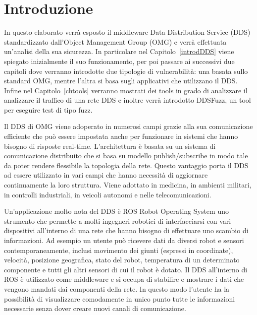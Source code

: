 \chapter{Introduzione}
In questo elaborato verrà esposto il middleware Data Distribution 
Service (DDS) standardizzato dall'Object Management Group (OMG) e 
verrà effettuata un'analisi della sua sicurezza.
In particolare nel Capitolo~\ref{introdDDS} 
viene spiegato inizialmente 
il suo funzionamento, per poi passare ai successivi due capitoli 
dove verranno introdotte due tipologie di vulnerabilità: una 
basata sullo standard OMG, mentre l'altra si basa sugli applicativi
che utilizzano il DDS. Infine nel Capitolo~\ref{chtools} 
verranno 
mostrati dei tools in grado di analizzare il analizzare 
il traffico di una rete DDS e inoltre verrà introdotto DDSFuzz, 
un tool per eseguire test di tipo fuzz.

Il DDS di OMG viene adoperato in numerosi campi grazie alla 
sua comunicazione efficiente che può essere impostata anche 
per funzionare in sistemi che hanno bisogno di risposte 
real-time. L'architettura è basata su un sistema di comunicazione 
distribuito che si basa su modello publish/subscribe in modo 
tale da poter rendere flessibile la topologia della rete.
Questo vantaggio porta il DDS ad essere utilizzato in vari campi 
che hanno necessità di aggiornare continuamente la loro 
struttura. Viene adottato in medicina, in ambienti militari, 
in controlli industriali, in veicoli autonomi e nelle telecomunicazioni.

Un'applicazione molto nota del DDS è ROS Robot Operating System
uno strumento che permette a molti ingegneri robotici di 
interfacciarsi con vari dispositivi all'interno di una 
rete che hanno bisogno di effettuare uno scambio di informazioni.
Ad esempio un utente può ricevere dati da diversi robot e sensori
contemporaneamente, inclusi 
movimento dei giunti (espressi in coordinate), velocità, 
posizione geografica, stato del robot, temperatura di un 
determinato componente e tutti gli altri sensori di cui il 
robot è dotato. Il DDS all'interno di ROS è utilizzato come 
middleware e si occupa di stabilire e mostrare i dati 
che vengono mandati dai componenti della rete. 
In questo modo l'utente ha la possibilità di visualizzare 
comodamente in unico punto tutte le informazioni necessarie 
senza dover creare nuovi canali di comunicazione.


